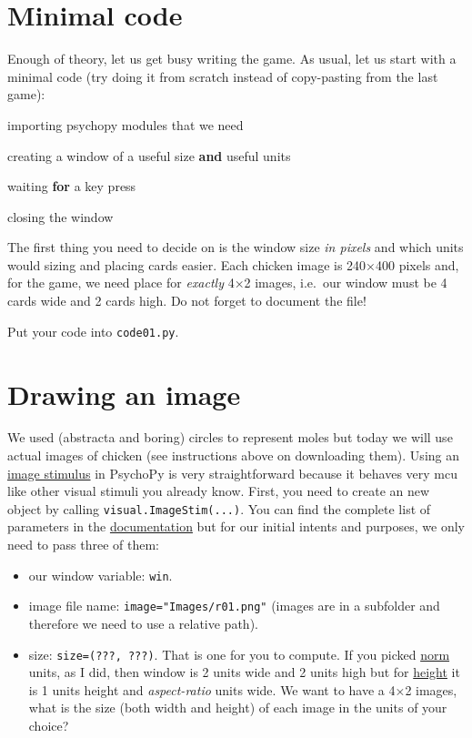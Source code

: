 \documentclass[
]{book}
\newenvironment{Shaded}{\begin{snugshade}}{\end{snugshade}}
\newcommand{\ControlFlowTok}[1]{\textcolor[rgb]{0.13,0.29,0.53}{\textbf{#1}}}
\newcommand{\KeywordTok}[1]{\textcolor[rgb]{0.13,0.29,0.53}{\textbf{#1}}}
\newcommand{\NormalTok}[1]{#1}
\providecommand{\tightlist}{%
  \setlength{\itemsep}{0pt}\setlength{\parskip}{0pt}}
\begin{document}
\hypertarget{minimal-code}{%
\section{Minimal code}\label{minimal-code}}

Enough of theory, let us get busy writing the game. As usual, let us start with a minimal code (try doing it from scratch instead of copy-pasting from the last game):

\begin{Shaded}
\begin{Highlighting}[]
\NormalTok{importing psychopy modules that we need}
 
\NormalTok{creating a window of a useful size }\KeywordTok{and}\NormalTok{ useful units}

\NormalTok{waiting }\ControlFlowTok{for}\NormalTok{ a key press}

\NormalTok{closing the window}
\end{Highlighting}
\end{Shaded}

The first thing you need to decide on is the window size \emph{in pixels} and which units would sizing and placing cards easier. Each chicken image is 240×400 pixels and, for the game, we need place for \emph{exactly} 4×2 images, i.e.~our window must be 4 cards wide and 2 cards high. Do not forget to document the file!

Put your code into \texttt{code01.py}.

\hypertarget{imagestim}{%
\section{Drawing an image}\label{imagestim}}

We used (abstracta and boring) circles to represent moles but today we will use actual images of chicken (see instructions above on downloading them). Using an \href{https://psychopy.org/api/visual/imagestim.html}{image stimulus} in PsychoPy is very straightforward because it behaves very mcu like other visual stimuli you already know. First, you need to create an new object by calling \texttt{visual.ImageStim(...)}. You can find the complete list of parameters in the \href{(https://psychopy.org/api/visual/imagestim.html)}{documentation} but for our initial intents and purposes, we only need to pass three of them:

\begin{itemize}
\tightlist
\item
  our window variable: \texttt{win}.
\item
  image file name: \texttt{image="Images/r01.png"} (images are in a subfolder and therefore we need to use a relative path).
\item
  size: \texttt{size=(???,\ ???)}. That is one for you to compute. If you picked \protect\hyperlink{psychopy-units-norm}{norm} units, as I did, then window is 2 units wide and 2 units high but for \protect\hyperlink{psychopy-units-height}{height} it is 1 units height and \emph{aspect-ratio} units wide. We want to have a 4×2 images, what is the size (both width and height) of each image in the units of your choice?
\end{itemize}
\end{document}
